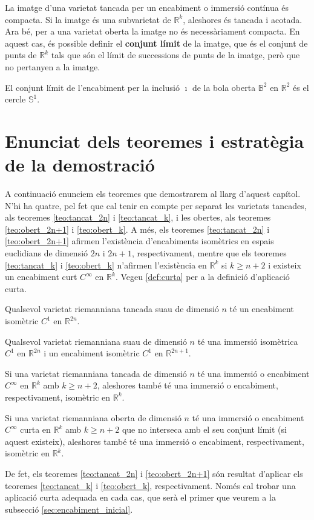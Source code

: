 La imatge d'una varietat tancada per un encabiment o immersió contínua és compacta. Si la imatge és una subvarietat de $\mathbb R^k$, aleshores és tancada i acotada. Ara bé, per a una varietat oberta la imatge no és necessàriament compacta. En aquest cas, és possible definir el \textbf{conjunt límit} de la imatge, que és el conjunt de punts de $\mathbb R^k$ tals que són el límit de successions de punts de la imatge, però que no pertanyen a la imatge. 

\begin{ex}
    El conjunt límit de l'encabiment per la inclusió $\imath$ de la bola oberta $\mathbb B^2$ en $\mathbb R^2$ és el cercle $\mathbb S^1$.
\end{ex}

\section{Enunciat dels teoremes i estratègia de la demostració}
A continuació enunciem els teoremes que demostrarem al llarg d'aquest capítol. N'hi ha quatre, pel fet que cal tenir en compte per separat les varietats tancades, als teoremes \ref{teo:tancat_2n} i \ref{teo:tancat_k}, i les obertes, als teoremes \ref{teo:obert_2n+1} i \ref{teo:obert_k}. A més, els teoremes \ref{teo:tancat_2n} i \ref{teo:obert_2n+1} afirmen l'existència d'encabiments isomètrics en espais euclidians de dimensió $2n$ i $2n+1$, respectivament, mentre que els teoremes \ref{teo:tancat_k} i \ref{teo:obert_k} n'afirmen l'existència en $\mathbb R^k$ si $k\ge n+2$ i existeix un encabiment curt $C^\infty$ en $\mathbb R^{k}$. Vegeu \ref{def:curta} per a la definició d'aplicació curta.

\begin{teo}\label{teo:tancat_2n}
    Qualsevol varietat riemanniana tancada suau de dimensió $n$ té un encabiment isomètric $C^1$ en $\mathbb R^{2n}$.
\end{teo}
\begin{teo}\label{teo:obert_2n+1}
    Qualsevol varietat riemanniana suau de dimensió $n$ té una immersió isomètrica $C^1$ en $\mathbb R^{2n}$ i un encabiment isomètric $C^1$ en $\mathbb R^{2n+1}$.
\end{teo}
\begin{teo}\label{teo:tancat_k}
    Si una varietat riemanniana tancada de dimensió $n$ té una immersió o encabiment $C^\infty$ en $\mathbb R^{k}$ amb $k\ge n+2$, aleshores també té una immersió o encabiment, respectivament, isomètric en $\mathbb R^{k}$.
\end{teo}
\begin{teo}\label{teo:obert_k}
    Si una varietat riemanniana oberta de dimensió $n$ té una immersió o encabiment $C^\infty$ curta en $\mathbb R^{k}$ amb $k\ge n+2$ que no interseca amb el seu conjunt límit (si aquest existeix), aleshores també té una immersió o encabiment, respectivament, isomètric en $\mathbb R^{k}$.
\end{teo}
De fet, els teoremes \ref{teo:tancat_2n} i \ref{teo:obert_2n+1} són resultat d'aplicar els teoremes \ref{teo:tancat_k} i \ref{teo:obert_k}, respectivament. Només cal trobar una aplicació curta adequada en cada cas, que serà el primer que veurem a la subsecció \ref{sec:encabiment_inicial}.

